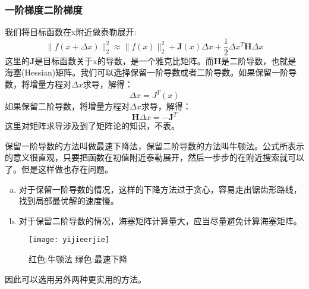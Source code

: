 \subsubsection{一阶梯度二阶梯度}
我们将目标函数在x附近做泰勒展开:
\begin{equation}
\|f(x+\Delta x)\|_{2}^{2} \approx\|f(x)\|_{2}^{2}+\boldsymbol{J}(x) \Delta x
+ \frac{1}{2}\Delta x^T \boldsymbol{H}\Delta x
\end{equation}
这里的$\boldsymbol{J}$是目标函数关于x的导数，是一个雅克比矩阵。而$\boldsymbol{H}$是二阶导数，也就是海塞(Hessian)矩阵。我们可以选择保留一阶导数或者二阶导数。如果保留一阶导数，将增量方程对$\Delta x$求导，解得：
\begin{equation}
	\Delta x = J^T(x)
\end{equation}
如果保留二阶导数，将增量方程对$\Delta x$求导，解得：
\begin{equation}
	\boldsymbol{H}\Delta x=-\boldsymbol{J}^T
\end{equation}
这里对矩阵求导涉及到了矩阵论的知识，不表。\par
保留一阶导数的方法叫做最速下降法，保留二阶导数的方法叫牛顿法。公式所表示的意义很直观，只要把函数在初值附近泰勒展开，然后一步步的在附近搜索就可以了。但是这样做也存在问题。
\begin{enumerate}[(a)]
	\item 对于保留一阶导数的情况，这样的下降方法过于贪心，容易走出锯齿形路线，找到局部最优解的速度慢。
	\item 对于保留二阶导数的情况，海塞矩阵计算量大，应当尽量避免计算海塞矩阵。
\end{enumerate}\par
\begin{figure}[H]
	\centering
	\texttt{[image: yijieerjie]}
	\caption{红色:牛顿法 绿色:最速下降}
\end{figure}
因此可以选用另外两种更实用的方法。

